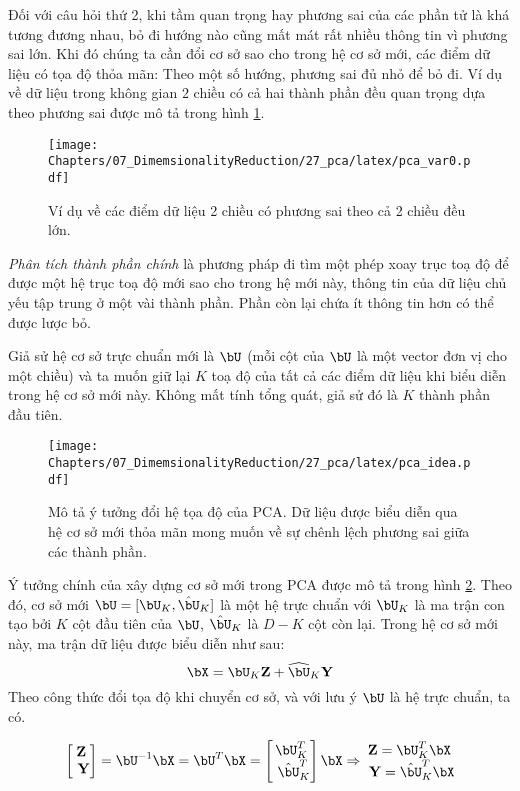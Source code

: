 Đối với câu hỏi thứ 2, khi tầm quan trọng hay phương sai của các phần tử là khá tương đương nhau, bỏ đi hướng nào cũng mất mát rất nhiều thông tin vì phương sai lớn. Khi đó chúng ta cần đổi cơ sở sao cho trong hệ cơ sở mới, các điểm dữ liệu có tọa độ thỏa mãn: Theo một số hướng, phương sai đủ nhỏ để bỏ đi. Ví dụ về dữ liệu trong không gian $2$ chiều có cả hai thành phần đều quan trọng dựa theo phương sai được mô tả trong hình \ref{hinh2}.

\begin{figure}[ht]
		\centering
		\texttt{[image: Chapters/07\_DimemsionalityReduction/27\_pca/latex/pca\_var0.pdf]}
		\label{hinh2}
	\caption{Ví dụ về các điểm dữ liệu 2 chiều có phương sai theo cả 2 chiều đều lớn.}
\end{figure}

\textit{Phân tích thành phần chính} là phương pháp đi tìm một phép xoay trục toạ độ để được một hệ trục toạ độ mới sao
cho trong hệ mới này, thông tin của dữ liệu chủ yếu tập trung ở một vài thành phần. Phần còn lại chứa ít thông tin hơn có thể được lược bỏ. 

Giả sử hệ cơ sở trực chuẩn mới là $\bU$ (mỗi cột của $\bU$ là một vector đơn vị cho một chiều) và ta muốn giữ lại $K$ toạ độ của tất cả các điểm dữ liệu khi biểu diễn trong hệ cơ sở mới này. Không mất tính tổng quát, giả sử đó là $K$ thành phần đầu tiên.
\begin{figure}[t]
	\centering
	\texttt{[image: Chapters/07\_DimemsionalityReduction/27\_pca/latex/pca\_idea.pdf]}
	\caption{Mô tả ý tưởng đổi hệ tọa độ của PCA. Dữ liệu được biểu diễn qua hệ cơ sở mới thỏa mãn mong muốn về sự chênh lệch phương sai giữa các thành phần.}
	\label{hinh3}
\end{figure}
Ý tưởng chính của xây dựng cơ sở mới trong PCA được mô tả trong hình \ref{hinh3}. Theo đó, cơ sở mới $\bU = [\bU_K, \hat{\bU}_K]$ là một hệ trực chuẩn với $\bU_K$ là ma trận con tạo bởi $K$ cột đầu tiên của $\bU$, $\hat{\bU}_K$ là $D-K$ cột còn lại. Trong hệ cơ sở mới này, ma trận dữ liệu được biểu diễn như sau:
\begin{equation}
\label{eqn:27_8}
\bX = \bU_K \mathbf{Z} + \widehat{\bU}_K \mathbf{Y}
\end{equation}
Theo công thức đổi tọa độ khi chuyển cơ sở, và với lưu ý $\bU $ là hệ trực chuẩn, ta có.

\begin{eqnarray}
\label{eqn:27_9}
\left[\begin{matrix} \mathbf{Z} \\\ \mathbf{Y} \end{matrix} \right] = \bU^{-1}\bX = \bU^T \bX= 
\left[\begin{matrix} \bU_K^T \\\ \hat{\bU}_K^T \end{matrix} \right]\bX \Rightarrow
\begin{matrix}
\mathbf{Z} = \bU_K^T \bX \\\
\mathbf{Y} = \hat{\bU}_K^T\bX
\end{matrix}
\end{eqnarray}

